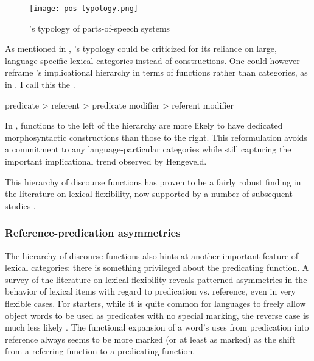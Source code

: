 \begin{figure}[h]
  \centering
  \texttt{[image: pos-typology.png]}
  \caption[Hengeveld's typology of parts-of-speech systems]{\citeauthor{Hengeveld1992}'s \parencite*[69]{Hengeveld1992} typology of parts-of-speech systems}
  \label{fig:Hengeveld-pos-systems}
\end{figure}

As mentioned in , \citeauthor{Hengeveld1992}'s typology could be criticized for its reliance on large, language-specific lexical categories instead of constructions. One could however reframe \citeauthor{Hengeveld1992}'s implicational hierarchy in terms of functions rather than categories, as in . I call this the .

\begin{exe}
  \ex\label{ex:2.9} predicate > referent > predicate modifier > referent modifier
\end{exe}

\noindent In , functions to the left of the hierarchy are more likely to have dedicated morphosyntactic constructions than those to the right. This reformulation avoids a commitment to any language-particular categories while still capturing the important implicational trend observed by Hengeveld.

This hierarchy of discourse functions has proven to be a fairly robust finding in the literature on lexical flexibility, now supported by a number of subsequent studies \parencites{Anward2000}{Rijkhoff2000}{Vogel2000}{Beck2002}{Rijkhoff2002}{Rijkhoff2003}{HengeveldRijkhoffSiewierska2004}{Lier2006}{Hengeveld2007}{HengeveldLier2012}{HengeveldValstar2010}{Beck2013}{Bisang2013}{Hengeveld2013}.

\subsubsection{Reference-predication asymmetries}
\label{sec:2.3.2.2}

The hierarchy of discourse functions also hints at another important feature of lexical categories: there is something privileged about the predicating function. A survey of the literature on lexical flexibility reveals patterned asymmetries in the behavior of lexical items with regard to predication vs. reference, even in very flexible cases. For starters, while it is quite common for languages to freely allow object words to be used as predicates with no special marking, the reverse case is much less likely \textcite[745]{HopperThompson1984}. The functional expansion of a word's uses from predication into reference always seems to be more marked (or at least as marked) as the shift from a referring function to a predicating function.

